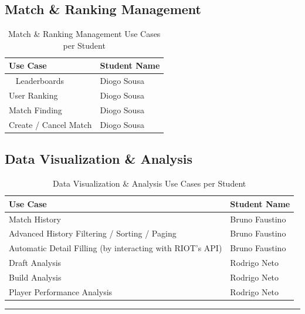 \documentclass[11pt,a4paper]{article}
\newcommand{\bff}[1]{\textbf{#1}}
\begin{document}
 \subsection{Match \& Ranking Management}

 \begin{table}[H]
 \begin{tabular}{|p{10cm}|p{5cm}|}
 \hline
 \bff{Use Case}  & \bff{Student Name} \\ \hline           
 Leaderboards    & Diogo Sousa \\ \hline
 User Ranking    & Diogo Sousa \\ \hline
 Match Finding   & Diogo Sousa \\ \hline
 Create / Cancel Match & Diogo Sousa \\ \hline
 \end{tabular}
 \caption{Match \& Ranking Management Use Cases per Student}
 \label{tab:use-cases-match-ranking-management}
 \end{table}

 \subsection{Data Visualization \& Analysis}

 \begin{table}[H]
 \begin{tabular}{|p{10cm}|p{5cm}|}
 \hline
 \bff{Use Case}           & \bff{Student Name} \\ \hline          
 Match History            & Bruno Faustino \\ \hline
 Advanced History Filtering / Sorting / Paging    & Bruno Faustino \\ \hline
 Automatic Detail Filling (by interacting with RIOT's API) & Bruno Faustino \\ \hline
 Draft Analysis           & Rodrigo Neto \\ \hline
 Build Analysis           & Rodrigo Neto \\ \hline
 Player Performance Analysis        & Rodrigo Neto \\ \hline
 \end{tabular}
 \caption{Data Visualization \& Analysis Use Cases per Student}
 \label{tab:use-cases-data-visualization-analysis}
 \end{table}

 \vspace{1cm}
 \hrule
 \vspace{1cm}
\end{document}
